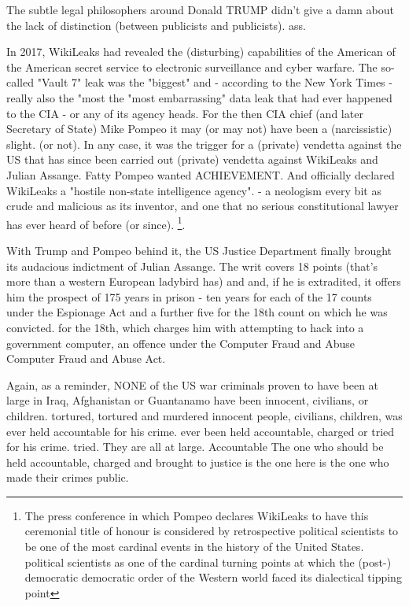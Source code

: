 \begin{multicols}{2}
The subtle legal philosophers around Donald
TRUMP didn't give a damn about the lack of distinction (between publicists and publicists).
ass.

In 2017, WikiLeaks had revealed the (disturbing) capabilities of the American
of the American secret service to electronic
surveillance and cyber warfare. The so-called "Vault 7" leak was the "biggest" and - according to the New York Times - really also the "most
the "most embarrassing" data leak that had ever happened to the CIA
- or any of its agency heads. For the then
CIA chief (and later Secretary of State) Mike Pompeo
it may (or may not) have been a (narcissistic) slight.
(or not). In any case, it was the trigger
for a (private) vendetta against the US that has since been carried out
(private) vendetta against WikiLeaks and Julian Assange.
Fatty Pompeo wanted ACHIEVEMENT. And officially declared WikiLeaks a "hostile non-state intelligence agency".
- a neologism every bit as crude and malicious as its inventor, and one that no serious constitutional lawyer has ever heard of before (or since).
\footnote[5]{The press conference in which Pompeo declares WikiLeaks to have this ceremonial title of honour is considered by retrospective political scientists to be one of the most cardinal events in the history of the United States.
political scientists as one of the cardinal turning points at which the (post-) democratic
democratic order of the Western world faced its dialectical tipping point}.

With Trump and Pompeo behind it, the US Justice Department finally brought its audacious indictment of
Julian Assange. The writ covers 18 points (that's
more than a western European ladybird has) and
and, if he is extradited, it offers him the prospect of 175 years in prison - ten years for each of the 17 counts under the Espionage Act and a further five for the 18th count on which he was convicted.
for the 18th, which charges him with attempting to hack into a government
computer, an offence under the Computer Fraud and Abuse
Computer Fraud and Abuse Act.

Again, as a reminder, NONE of the US war criminals proven to have been at large in Iraq, Afghanistan or Guantanamo have been innocent, civilians, or children.
tortured, tortured and murdered innocent people, civilians, children, was ever held accountable for his crime.
ever been held accountable, charged or tried for his crime.
tried. They are all at large. Accountable
The one who should be held accountable, charged and brought to justice is the one
here is the one who made their crimes public.


\end{multicols}
